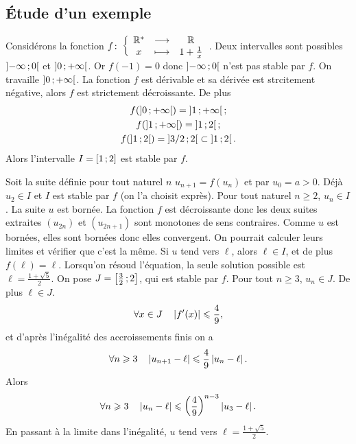 \subsection{Étude d'un exemple}

Considérons la fonction \(f\colon \left\{\begin{array}{ccc} \mathbb{R}^{*} & \longrightarrow &\mathbb{R}\\ x & \longmapsto & 1+\frac{1}{x} \end{array} \right.\). Deux intervalles sont possibles \(\left] -\infty \, ;  0 \right[\) et \(\left] 0 \, ;  +\infty \right[\). Or \(f(-1)=0\) donc \(\left] -\infty \, ;  0 \right[\) n'est pas stable par \(f\). On travaille \(\left] 0 \, ;  +\infty \right[\). La fonction \(f\) est dérivable et sa dérivée est strcitement négative, alors \(f\) est strictement décroissante. De plus
\begin{gather}
 f(\left] 0 \, ;  +\infty \right[)=\left] 1 \, ;  +\infty \right[; \\
 f(\left] 1 \, ;  +\infty \right[)=\left] 1 \, ;  2 \right[;\\
 f(\left] 1 \, ;  2 \right[)=\left] 3/2 \, ;  2 \right[ \subset \left] 1 \, ;  2 \right[.
\end{gather}
Alors l'intervalle \(I=\left[ 1 \, ;  2 \right]\) est stable par \(f\).

Soit la suite définie pour tout naturel \(n\) \(u_{n+1}=f(u_n)\) et par \(u_0 = a>0\). Déjà \(u_2 \in I\) et \(I\) est stable par \(f\) (on l'a choisit exprès). Pour tout naturel \(n \geqslant 2\), \(u_n \in I\). La suite \(u\) est bornée. La fonction \(f\) est décroissante donc les deux suites extraites \((u_{2n})\) et \((u_{2n+1})\) sont monotones de sens contraires. Comme \(u\) est bornées, elles sont bornées donc elles convergent. On pourrait calculer leurs limites et vérifier que c'est la même. Si \(u\) tend vers \(\ell\), alors \(\ell \in I\), et de plus \(f(\ell)=\ell\). Lorsqu'on résoud l'équation, la seule solution possible est \(\ell=\frac{1+\sqrt{5}}{2}\). On pose \(J=\left[ \frac{3}{2} \, ;  2 \right]\), qui est stable par \(f\). Pour tout \(n \geqslant 3\), \(u_n \in J\). De plus \(\ell \in J\).
\begin{equation}
  \forall x \in J \quad \left\lvert f'(x)\right\rvert\leqslant \frac{4}{9},
\end{equation}
et d'après l'inégalité des accroissements finis on a
\begin{equation}
 \forall n \geqslant 3 \quad \left\lvert u_{n+1}-\ell\right\rvert  \leqslant \frac{4}{9} \left\lvert u_n-\ell\right\rvert.
\end{equation}
Alors
\begin{equation}
  \forall n \geqslant 3 \quad \left\lvert u_n-\ell\right\rvert \leqslant \left(\frac{4}{9}\right)^{n-3}\left\lvert u_3-\ell\right\rvert.
\end{equation}
En passant à la limite dans l'inégalité, \(u\) tend vers \(\ell=\frac{1+\sqrt{5}}{2}\).

